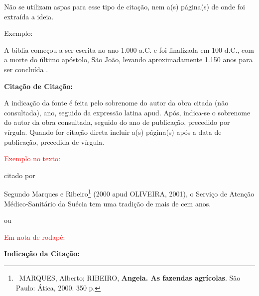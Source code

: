 
\bigskip

Não se utilizam aspas para esse tipo de citação, nem a(s) página(s) de onde foi extraída a ideia.\\

\bigskip

{\color{red}
Exemplo:}

\bigskip

A bíblia começou a ser escrita no ano 1.000 a.C. e foi finalizada em 100 d.C., com a morte do último apóstolo, São João, levando aproximadamente 1.150 anos para ser concluída \cite{book:GHELLER}.\\


\bigskip

{\centering\bfseries\color{red}
Citação de Citação:
\par}

\bigskip

A indicação da fonte é feita pelo sobrenome do autor da obra citada (não consultada), ano, seguido da expressão latina apud. Após, indica-se o sobrenome do autor da obra consultada, seguido do ano de publicação, precedido por vírgula. Quando for citação direta incluir a(s) página(s) após a data de publicação, precedida de vírgula.\\

\bigskip

{\sffamily
\textrm{\textcolor{red}{Exemplo no texto}}\textrm{:}}

\bigskip

{\sffamily
\textrm{citado por }}

\bigskip

{\sffamily
\textrm{Segundo Marques e Ribeiro}\footnote{\ MARQUES, Alberto; RIBEIRO, \textbf{Angela. As fazendas agrícolas}. São
Paulo: Ática, 2000. 350 p.}\textrm{ (2000 }\textrm{\textcolor{black}{apud }}\textrm{OLIVEIRA, 2001),  o Serviço de
Atenção Médico-Sanitário da Suécia tem uma tradição de mais de cem anos. }}

\bigskip

{\color{red}
ou}

{\sffamily
\textrm{\textcolor{red}{Em nota de rodapé}}\textrm{:}}

\bigskip

{\centering\bfseries\color{red}
Indicação da Citação:
\par}

